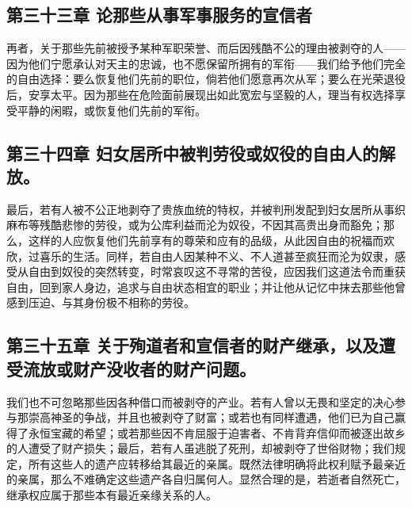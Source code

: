 
\subsection{第三十三章 论那些从事军事服务的宣信者}

再者，关于那些先前被授予某种军职荣誉、而后因残酷不公的理由被剥夺的人——因为他们宁愿承认对天主的忠诚，也不愿保留所拥有的军衔——我们给予他们完全的自由选择：要么恢复他们先前的职位，倘若他们愿意再次从军；要么在光荣退役后，安享太平。因为那些在危险面前展现出如此宽宏与坚毅的人，理当有权选择享受平静的闲暇，或恢复他们先前的军衔。\par


\subsection{第三十四章 妇女居所中被判劳役或奴役的自由人的解放。}

最后，若有人被不公正地剥夺了贵族血统的特权，并被判刑发配到妇女居所从事织麻布等残酷悲惨的劳役，或为公库利益而沦为奴役，不因其高贵出身而豁免；那么，这样的人应恢复他们先前享有的尊荣和应有的品级，从此因自由的祝福而欢欣，过喜乐的生活。同样，若自由人因某种不义、不人道甚至疯狂而沦为奴隶，感受从自由到奴役的突然转变，时常哀叹这不寻常的苦役，应因我们这道法令而重获自由，回到家人身边，追求与自由状态相宜的职业；并让他从记忆中抹去那些他曾感到压迫、与其身份极不相称的劳役。\par


\subsection{第三十五章 关于殉道者和宣信者的财产继承，以及遭受流放或财产没收者的财产问题。}

我们也不可忽略那些因各种借口而被剥夺的产业。若有人曾以无畏和坚定的决心参与那崇高神圣的争战，并且也被剥夺了财富；或若也有同样遭遇，他们已为自己赢得了永恒宝藏的希望；或若那些因不肯屈服于迫害者、不肯背弃信仰而被逐出故乡的人遭受了财产损失；最后，若有人虽逃脱了死刑，却被剥夺了世俗财物；我们规定，所有这些人的遗产应转移给其最近的亲属。既然法律明确将此权利赋予最亲近的亲属，那么不难确定这些遗产各自归属何人。显然合理的是，若逝者自然死亡，继承权应属于那些本有最近亲缘关系的人。\par

